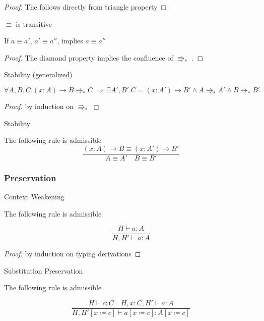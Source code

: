 \begin{proof}
The follows directly from triangle property
\end{proof}
\begin{thm}
$\equiv$ is transitive

If $a\equiv a'$, $a'\equiv a''$, implies $a\equiv a''$ 
\end{thm}

\begin{proof}
The diamond property implies the confluence of $\Rrightarrow_{\ast}$
.
\end{proof}
\begin{lem}
Stability (generalized)

$\forall A,B,C.\left(x:A\right)\rightarrow B\Rrightarrow_{\ast}C\:\Rightarrow\:\exists A',B'.C=\left(x:A'\right)\rightarrow B'\land A\Rrightarrow_{\ast}A'\land B\Rrightarrow_{\ast}B'$
\end{lem}

\begin{proof}
by induction on $\Rrightarrow_{\ast}$
\end{proof}
\begin{cor}
Stability

The following rule is admissible
\[
\frac{\left(x:A\right)\rightarrow B\equiv\left(x:A'\right)\rightarrow B'}{A\equiv A'\quad B\equiv B'}
\]
\end{cor}


\subsubsection{Preservation}
\begin{lem}
Context Weakening

The following rule is admissible

\[
\frac{H\vdash a:A}{H,H'\vdash a:A}
\]
\end{lem}

\begin{proof}
by induction on typing derivations
\end{proof}
\begin{lem}
Substitution Preservation

The following rule is admissible

\[
\frac{H\vdash c:C\quad H,x:C,H'\vdash a:A}{H,H'\left[x\coloneqq c\right]\vdash a\left[x\coloneqq c\right]:A\left[x\coloneqq c\right]}
\]
\end{lem}

